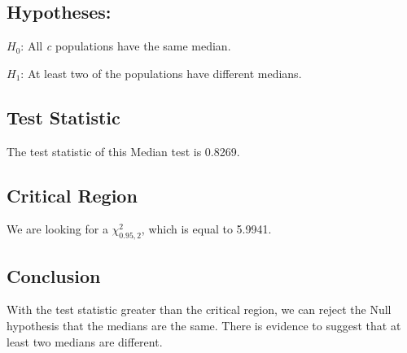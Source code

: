 \documentclass[]{tufte-handout}
\begin{document}
\subsection{Hypotheses:}\label{hypotheses-4}

\(H_{0}\): All \emph{c} populations have the same median.

\(H_{1}\): At least two of the populations have different medians.

\subsection{Test Statistic}\label{test-statistic-4}

The test statistic of this Median test is 0.8269.

\subsection{Critical Region}\label{critical-region-4}

We are looking for a \(\chi_{0.95, 2}^2\), which is equal to 5.9941.

\subsection{Conclusion}\label{conclusion-4}

With the test statistic greater than the critical region, we can reject
the Null hypothesis that the medians are the same. There is evidence to
suggest that at least two medians are different.


\end{document}
